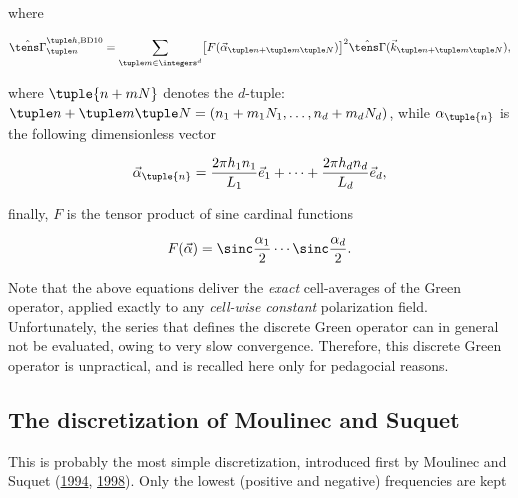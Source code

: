 \documentclass[oneside]{memoir}
\begin{document}
where



\begin{equation*}
\begin{split}\hat{\tens\Gamma}_{\tuple n}^{\tuple h, \mathrm{BD10}}
=\sum_{\tuple m\in\integers^d}\bigl[F(\vec\alpha_{\tuple n+\tuple m\tuple N})
\bigr]^2\hat{\tens\Gamma}(\vec k_{\tuple n+\tuple m\tuple N}),\end{split}\end{equation*}


where \(\tuple{n+mN}\) denotes the \(d\)-tuple: \(\tuple n+\tuple m\tuple N=(n_1+m_1N_1, \ldots, n_d+m_dN_d)\), while \(\alpha_{\tuple{n}}\) is the following dimensionless vector



\begin{equation*}
\begin{split}\vec\alpha_{\tuple{n}}
=\frac{2\pi h_1n_1}{L_1}\vec e_1+\cdots+\frac{2\pi h_dn_d}{L_d}\vec e_d,\end{split}\end{equation*}


finally, \(F\) is the tensor product of sine cardinal functions



\begin{equation*}
\begin{split}F(\vec\alpha)=\sinc\frac{\alpha_1}2\cdots\sinc\frac{\alpha_d}2.\end{split}\end{equation*}


Note that the above equations deliver the \emph{exact} cell-averages of the Green operator, applied exactly to any \emph{cell-wise constant} polarization field. Unfortunately, the series that defines the discrete Green operator can in general not be evaluated, owing to very slow convergence. Therefore, this discrete Green operator is unpractical, and is recalled here only for pedagocial reasons.



\hypertarget{4061870237023517960}{}


\subsection{The discretization of Moulinec and Suquet}



This is probably the most simple discretization, introduced first by Moulinec and Suquet (\hyperlink{1963195518433610412}{1994}, \hyperlink{7941652814461145344}{1998}). Only the lowest (positive and negative) frequencies are kept
\end{document}
